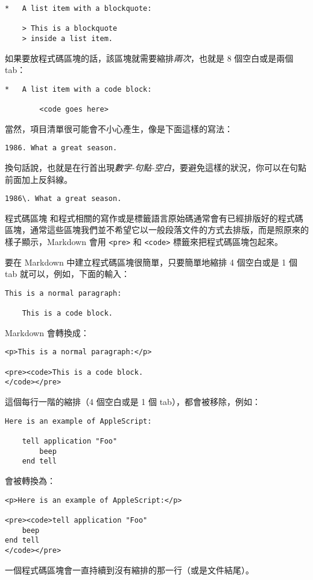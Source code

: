 \begin{verbatim}
*   A list item with a blockquote:

    > This is a blockquote
    > inside a list item.
\end{verbatim}
如果要放程式碼區塊的話，該區塊就需要縮排\emph{兩次}，也就是 8
個空白或是兩個 tab：

\begin{verbatim}
*   A list item with a code block:

        <code goes here>
\end{verbatim}
當然，項目清單很可能會不小心產生，像是下面這樣的寫法：

\begin{verbatim}
1986. What a great season.
\end{verbatim}
換句話說，也就是在行首出現\emph{數字-句點-空白}，要避免這樣的狀況，你可以在句點前面加上反斜線。

\begin{verbatim}
1986\. What a great season.
\end{verbatim}
程式碼區塊
和程式相關的寫作或是標籤語言原始碼通常會有已經排版好的程式碼區塊，通常這些區塊我們並不希望它以一般段落文件的方式去排版，而是照原來的樣子顯示，Markdown
會用 \texttt{\textless{}pre\textgreater{}} 和
\texttt{\textless{}code\textgreater{}} 標籤來把程式碼區塊包起來。

要在 Markdown 中建立程式碼區塊很簡單，只要簡單地縮排 4 個空白或是 1 個
tab 就可以，例如，下面的輸入：

\begin{verbatim}
This is a normal paragraph:

    This is a code block.
\end{verbatim}
Markdown 會轉換成：

\begin{verbatim}
<p>This is a normal paragraph:</p>

<pre><code>This is a code block.
</code></pre>
\end{verbatim}
這個每行一階的縮排（4 個空白或是 1 個 tab），都會被移除，例如：

\begin{verbatim}
Here is an example of AppleScript:

    tell application "Foo"
        beep
    end tell
\end{verbatim}
會被轉換為：

\begin{verbatim}
<p>Here is an example of AppleScript:</p>

<pre><code>tell application "Foo"
    beep
end tell
</code></pre>
\end{verbatim}
一個程式碼區塊會一直持續到沒有縮排的那一行（或是文件結尾）。

